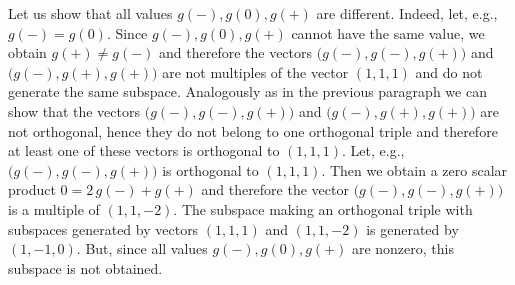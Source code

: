 \documentclass[fleqn,twoside]{article}
\begin{document}
Let us show that all values $g(-), g(0), g(+)$ are different. Indeed, let,
e.g., $g(-) = g(0)$. Since $g(-), g(0), g(+)$ cannot have the same value, we
obtain $g(+) \neq g(-)$ and therefore the vectors $\bigl( g(-), g(-), g(+)
\bigr)$ and $\bigl( g(-), g(+), g(+) \bigr)$ are not multiples of the vector
$(1,1,1)$ and do not generate the same subspace. Analogously as in the
previous paragraph we can show that the vectors $\bigl( g(-), g(-), g(+)
\bigr)$ and $\bigl( g(-), g(+), g(+) \bigr)$ are not orthogonal, hence they
do not belong to one orthogonal triple and therefore at least one of
these vectors is orthogonal to $(1,1,1)$. Let, e.g., $\bigl( g(-), g(-),
g(+) \bigr)$ is orthogonal to $(1,1,1)$. Then we obtain a zero scalar
product $0 = 2\,g(-) + g(+)$ and therefore the vector $\bigl( g(-), g(-),
g(+) \bigr)$ is a multiple of $(1,1,-2)$. The subspace making an orthogonal
triple with subspaces generated by vectors $(1,1,1)$ and $(1,1,-2)$ is
generated by $(1,-1,0)$. But, since all values $g(-), g(0), g(+)$ are
nonzero, this subspace is not obtained.
\end{document}
